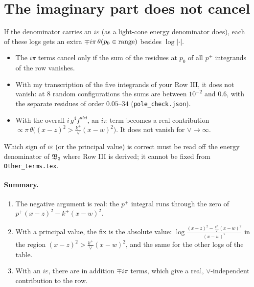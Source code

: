 \documentclass[10pt]{article}
\begin{document}
\section{The imaginary part does not cancel}
If the denominator carries an $i\varepsilon$ (as a light-cone energy denominator does), each of these logs gets an extra $\mp i\pi\,\theta(p_0\in{\rm range})$ besides $\log|\cdot|$.
\begin{itemize}
\item The $i\pi$ terms cancel only if the sum of the residues at $p_0$ of all $p^+$ integrands of the row vanishes.
\item With my transcription of the five integrands of your Row III, it does not vanish: at 8 random configurations the sums are between $10^{-2}$ and $0.6$, with the separate residues of order $0.05$--$34$ (\texttt{pole\_check.json}).
\item With the overall $i\,g^4f^{abd}$, an $i\pi$ term becomes a real contribution $\propto\pi\,\theta\big((x-z)^2>\frac{k^+}{\vee}(x-w)^2\big)$. It does not vanish for $\vee\to\infty$.
\end{itemize}
Which sign of $i\varepsilon$ (or the principal value) is correct must be read off the energy denominator of $\mathfrak B_3$ where Row III is derived; it cannot be fixed from \texttt{Other\_terms.tex}.

\paragraph{Summary.}
\begin{enumerate}
\item The negative argument is real: the $p^+$ integral runs through the zero of $p^+(x-z)^2-k^+(x-w)^2$.
\item With a principal value, the fix is the absolute value: $\log\frac{(x-z)^2-\frac{k^+}{\vee}(x-w)^2}{(x-w)^2}$ in the region $(x-z)^2>\frac{k^+}{\vee}(x-w)^2$, and the same for the other logs of the table.
\item With an $i\varepsilon$, there are in addition $\mp i\pi$ terms, which give a real, $\vee$-independent contribution to the row.
\end{enumerate}
\end{document}
